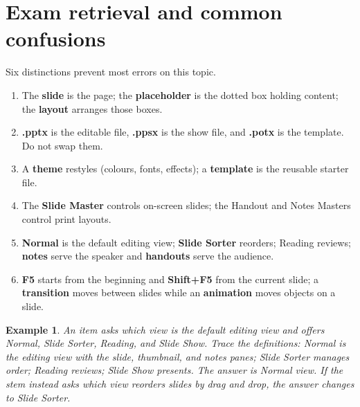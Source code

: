 \documentclass[11pt]{article}
\newtheorem{example}{Example}[section]
\begin{document}
\section{Exam retrieval and common confusions}
Six distinctions prevent most errors on this topic.
\begin{enumerate}
  \item The \textbf{slide} is the page; the \textbf{placeholder} is the
    dotted box holding content; the \textbf{layout} arranges those boxes.
  \item \textbf{.pptx} is the editable file, \textbf{.ppsx} is the show file,
    and \textbf{.potx} is the template. Do not swap them.
  \item A \textbf{theme} restyles (colours, fonts, effects); a
    \textbf{template} is the reusable starter file.
  \item The \textbf{Slide Master} controls on-screen slides; the Handout and
    Notes Masters control print layouts.
  \item \textbf{Normal} is the default editing view; \textbf{Slide Sorter}
    reorders; Reading reviews; \textbf{notes} serve the speaker and
    \textbf{handouts} serve the audience.
  \item \textbf{F5} starts from the beginning and \textbf{Shift+F5} from the
    current slide; a \textbf{transition} moves between slides while an
    \textbf{animation} moves objects on a slide.
\end{enumerate}

\begin{example}
An item asks which view is the default editing view and offers Normal, Slide
Sorter, Reading, and Slide Show. Trace the definitions: Normal is the editing
view with the slide, thumbnail, and notes panes; Slide Sorter manages order;
Reading reviews; Slide Show presents. The answer is Normal view. If the stem
instead asks which view reorders slides by drag and drop, the answer changes
to Slide Sorter.
\end{example}
\end{document}
